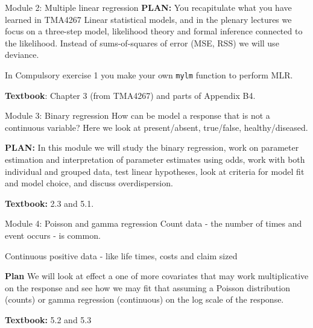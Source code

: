 \documentclass[
  ignorenonframetext,
]{beamer}
\begin{document}
\begin{frame}[fragile]
\begin{block}{Module 2: Multiple linear regression}
\protect\hypertarget{module-2-multiple-linear-regression}{}
\textbf{PLAN:} You recapitulate what you have learned in TMA4267 Linear
statistical models, and in the plenary lectures we focus on a three-step
model, likelihood theory and formal inference connected to the
likelihood. Instead of sums-of-squares of error (MSE, RSS) we will use
deviance.

In Compulsory exercise 1 you make your own \texttt{mylm} function to
perform MLR.

\textbf{Textbook}: Chapter 3 (from TMA4267) and parts of Appendix B4.
\end{block}
\end{frame}

\begin{frame}
\begin{block}{Module 3: Binary regression}
\protect\hypertarget{module-3-binary-regression}{}
How can be model a response that is not a continuous variable? Here we
look at present/absent, true/false, healthy/diseased.

\textbf{PLAN:} In this module we will study the binary regression, work
on parameter estimation and interpretation of parameter estimates using
odds, work with both individual and grouped data, test linear
hypotheses, look at criteria for model fit and model choice, and discuss
overdispersion.

\textbf{Textbook:} 2.3 and 5.1.
\end{block}
\end{frame}

\begin{frame}
\begin{block}{Module 4: Poisson and gamma regression}
\protect\hypertarget{module-4-poisson-and-gamma-regression}{}
Count data - the number of times and event occurs - is common.

Continuous positive data - like life times, costs and claim sized

\textbf{Plan} We will look at effect a one of more covariates that may
work multiplicative on the response and see how we may fit that assuming
a Poisson distribution (counts) or gamma regression (continuous) on the
log scale of the response.

\textbf{Textbook:} 5.2 and 5.3
\end{block}
\end{frame}
\end{document}
